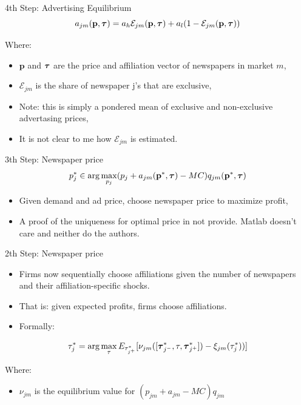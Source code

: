 \documentclass{beamer}
\begin{document}
\begin{frame}[t]{4th Step: Advertising Equilibrium}
  \[ a_{jm}(\textbf{p}, \text{\boldmath$\tau$}) = a_h\mathcal{E}_{jm}(\textbf{p},
    \text{\boldmath$\tau$}) + a_l(1 - \mathcal{E}_{jm}(\textbf{p}, \text{\boldmath$\tau$})) \]

  Where:
  \begin{itemize}
    \item $\textbf{p}$ and $\text{\boldmath$\tau$}$ are the price and affiliation vector of newspapers in market $m$,
    \item $\mathcal{E}_{jm}$ is the share of newspaper j's that are exclusive,
    \item Note: this is simply a pondered mean of exclusive and non-exclusive
      advertasing prices,
    \item It is not clear to me how $ \mathcal{E}_{jm}$ is estimated.
  \end{itemize}
\end{frame}

\begin{frame}[t]{3th Step: Newspaper price}
  \[ p^*_j \in \arg\max_{p_j} (p_j + a_{jm}(\textbf{p}^*, \text{\boldmath$\tau$})
    - MC)q_{jm}(\textbf{p}^*, \text{\boldmath$\tau$}) \]

  \begin{itemize}
    \item Given demand and ad price, choose newspaper price to maximize profit,
    \item A proof of the uniqueness for optimal price in not provide. Matlab doesn't
      care and neither do the authors.
  \end{itemize}
\end{frame}

\begin{frame}[t]{2th Step: Newspaper price}
  \begin{itemize}
    \item Firms now sequentially choose affiliations given the number of newspapers
      and their affiliation-specific shocks.
    \item That is: given expected profits, firms choose affiliations.
    \item Formally:
  \end{itemize}

  \[ \tau^*_j = \arg\max_{\tau} E_{\tau^*_{j^+}} [\nu_{jm}([
      \text{\boldmath$\tau$}^*_{j^-}, \tau,\text{\boldmath$\tau$}^*_{j^+}])
      - \xi_{jm}(\tau^*_j))] \]

    Where:
    \begin{itemize}
      \item $\nu_{jm}$ is the equilibrium value for $(p_{jm} + a_{jm} - MC)q_{jm}$
    \end{itemize}
\end{frame}
\end{document}
